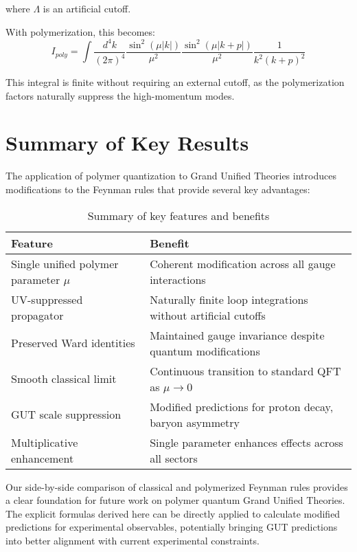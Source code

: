 \documentclass[11pt]{article}
\begin{document}
where $\Lambda$ is an artificial cutoff.

With polymerization, this becomes:
\begin{equation}
    I_{poly} = \int \frac{d^4k}{(2\pi)^4} \frac{\sin^2(\mu|k|)}{\mu^2} \frac{\sin^2(\mu|k+p|)}{\mu^2} \frac{1}{k^2(k+p)^2}
\end{equation}

This integral is finite without requiring an external cutoff, as the polymerization factors naturally suppress the high-momentum modes.

\section{Summary of Key Results}

The application of polymer quantization to Grand Unified Theories introduces modifications to the Feynman rules that provide several key advantages:

\begin{table}[h]
\centering
\begin{tabular}{|p{6cm}|p{6cm}|}
\hline
\textbf{Feature} & \textbf{Benefit} \\
\hline
Single unified polymer parameter $\mu$ & Coherent modification across all gauge interactions \\
\hline
UV-suppressed propagator & Naturally finite loop integrations without artificial cutoffs \\
\hline
Preserved Ward identities & Maintained gauge invariance despite quantum modifications \\
\hline
Smooth classical limit & Continuous transition to standard QFT as $\mu \to 0$ \\
\hline
GUT scale suppression & Modified predictions for proton decay, baryon asymmetry \\
\hline
Multiplicative enhancement & Single parameter enhances effects across all sectors \\
\hline
\end{tabular}
\caption{Summary of key features and benefits}
\label{tab:summary}
\end{table}

Our side-by-side comparison of classical and polymerized Feynman rules provides a clear foundation for future work on polymer quantum Grand Unified Theories. The explicit formulas derived here can be directly applied to calculate modified predictions for experimental observables, potentially bringing GUT predictions into better alignment with current experimental constraints.
\end{document}
